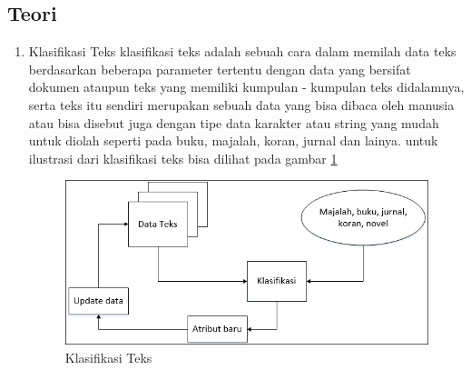 \subsection{Teori}
\begin{enumerate}
\item Klasifikasi Teks
\subitem klasifikasi teks adalah sebuah cara dalam memilah data teks berdasarkan beberapa parameter tertentu dengan data yang bersifat dokumen ataupun teks yang memiliki kumpulan - kumpulan teks didalamnya, serta teks itu sendiri merupakan sebuah data yang bisa dibaca oleh manusia atau bisa disebut juga dengan tipe data karakter atau string yang mudah untuk diolah seperti pada buku, majalah, koran, jurnal dan lainya. untuk ilustrasi dari klasifikasi teks bisa dilihat pada gambar \ref{coba1}
\begin{figure}[!htbp]
	\centering
	\includegraphics[width=1\textwidth]{figures/fathi/chapter4/hari1/1}
	\caption{Klasifikasi Teks}
	\label{coba1}
\end{figure}


\end{enumerate}
